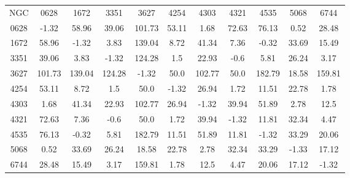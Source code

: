 \begin{table}
\begin{tabular}{ccccccccccc}
NGC & 0628 & 1672 & 3351 & 3627 & 4254 & 4303 & 4321 & 4535 & 5068 & 6744 \\
0628 & -1.32 & 58.96 & 39.06 & 101.73 & 53.11 & 1.68 & 72.63 & 76.13 & 0.52 & 28.48 \\
1672 & 58.96 & -1.32 & 3.83 & 139.04 & 8.72 & 41.34 & 7.36 & -0.32 & 33.69 & 15.49 \\
3351 & 39.06 & 3.83 & -1.32 & 124.28 & 1.5 & 22.93 & -0.6 & 5.81 & 26.24 & 3.17 \\
3627 & 101.73 & 139.04 & 124.28 & -1.32 & 50.0 & 102.77 & 50.0 & 182.79 & 18.58 & 159.81 \\
4254 & 53.11 & 8.72 & 1.5 & 50.0 & -1.32 & 26.94 & 1.72 & 11.51 & 22.78 & 1.78 \\
4303 & 1.68 & 41.34 & 22.93 & 102.77 & 26.94 & -1.32 & 39.94 & 51.89 & 2.78 & 12.5 \\
4321 & 72.63 & 7.36 & -0.6 & 50.0 & 1.72 & 39.94 & -1.32 & 11.81 & 32.34 & 4.47 \\
4535 & 76.13 & -0.32 & 5.81 & 182.79 & 11.51 & 51.89 & 11.81 & -1.32 & 33.29 & 20.06 \\
5068 & 0.52 & 33.69 & 26.24 & 18.58 & 22.78 & 2.78 & 32.34 & 33.29 & -1.33 & 17.12 \\
6744 & 28.48 & 15.49 & 3.17 & 159.81 & 1.78 & 12.5 & 4.47 & 20.06 & 17.12 & -1.32 \\
\end{tabular}
\end{table}
